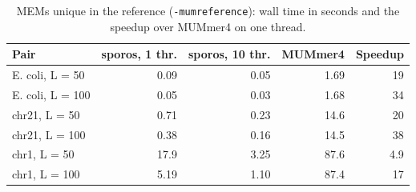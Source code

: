 \documentclass[10pt]{article}
\begin{document}
\begin{table}[H]
\caption{MEMs and MUMs of at least 100~bp, as main Table 3.}\label{tab:mems100}
\centering\footnotesize
\setlength{\tabcolsep}{4pt}
\end{table}

\begin{table}[H]
\caption{MEMs unique in the reference (\texttt{-mumreference}): wall time in seconds and the speedup over MUMmer4 on one thread.}\label{tab:mumreference}
\centering\footnotesize
\setlength{\tabcolsep}{4pt}
\begin{tabular}{@{}lrrrr@{}}
\toprule
Pair & sporos, 1 thr. & sporos, 10 thr. & MUMmer4 & Speedup \\
\midrule
E. coli, L = 50 & 0.09 & 0.05 & 1.69 & 19 \\
E. coli, L = 100 & 0.05 & 0.03 & 1.68 & 34 \\
chr21, L = 50 & 0.71 & 0.23 & 14.6 & 20 \\
chr21, L = 100 & 0.38 & 0.16 & 14.5 & 38 \\
chr1, L = 50 & 17.9 & 3.25 & 87.6 & 4.9 \\
chr1, L = 100 & 5.19 & 1.10 & 87.4 & 17 \\
\bottomrule
\end{tabular}
\end{table}
\end{document}
